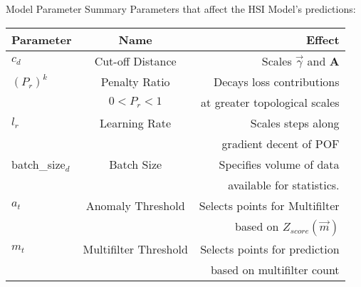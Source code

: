 \begin{frame}{Model Parameter Summary}
    \vfill
Parameters that affect the HSI Model's predictions:
\vfill
    \begin{table}
        \begin{tabular}{|l|| c| r|}\hline
            \textbf{Parameter} & \textbf{Name} & \textbf{Effect}  \\\hline \hline %
            $c_d$ & Cut-off Distance  &Scales $\vec{\gamma}$ and $\mathbf{A}$\\\hline
            $(P_r)^k$ & Penalty Ratio  &Decays loss contributions \\
            &$0<P_r<1$&at greater topological scales \\\hline
            $l_r$ & Learning Rate &Scales steps along\\
            & & gradient decent of POF\\\hline
            
            
            \hline\hline
            batch\_size$_d$ & Batch Size &Specifies volume of data\\
            &&available for statistics. \\\hline
            $a_t$ & Anomaly Threshold &Selects points for Multifilter\\
            &&based on $Z_{score}(\vec{m})$ \\\hline
            $m_t$ & Multifilter Threshold &Selects points for prediction\\
            &&based on multifilter count \\\hline
        \end{tabular}
    \end{table}
    \vfill
\end{frame}
